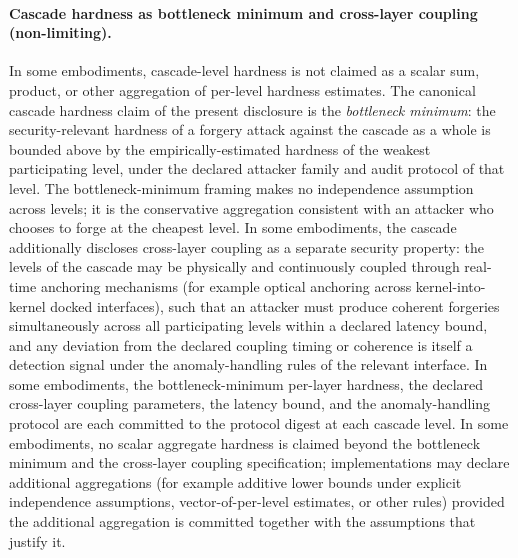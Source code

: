 \documentclass[a4paper,12pt]{article}
\begin{document}
\paragraph{Cascade hardness as bottleneck minimum and cross-layer
coupling (non-limiting).}
In some embodiments, cascade-level hardness is not claimed as a
scalar sum, product, or other aggregation of per-level hardness
estimates. The canonical cascade hardness claim of the present
disclosure is the \emph{bottleneck minimum}: the security-relevant
hardness of a forgery attack against the cascade as a whole is
bounded above by the empirically-estimated hardness of the weakest
participating level, under the declared attacker family and audit
protocol of that level. The bottleneck-minimum framing makes no
independence assumption across levels; it is the conservative
aggregation consistent with an attacker who chooses to forge at the
cheapest level. In some embodiments, the cascade additionally
discloses cross-layer coupling as a separate security property: the
levels of the cascade may be physically and continuously coupled
through real-time anchoring mechanisms (for example optical anchoring
across kernel-into-kernel docked interfaces), such that an attacker
must produce coherent forgeries simultaneously across all participating
levels within a declared latency bound, and any deviation from the
declared coupling timing or coherence is itself a detection signal
under the anomaly-handling rules of the relevant interface. In some
embodiments, the bottleneck-minimum per-layer hardness, the
declared cross-layer coupling parameters, the latency bound, and the
anomaly-handling protocol are each committed to the protocol digest
at each cascade level. In some embodiments, no scalar aggregate
hardness is claimed beyond the bottleneck minimum and the
cross-layer coupling specification; implementations may declare
additional aggregations (for example additive lower bounds under
explicit independence assumptions, vector-of-per-level estimates,
or other rules) provided the additional aggregation is committed
together with the assumptions that justify it.
\end{document}
